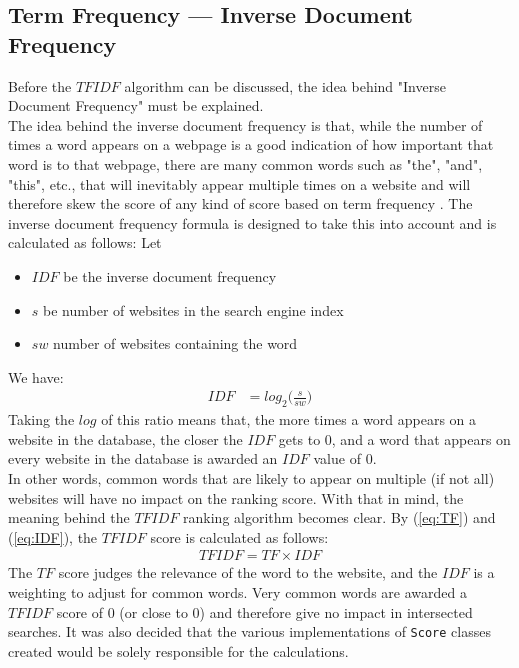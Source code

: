 \subsection{Term Frequency — Inverse Document Frequency}
Before the $TFIDF$ algorithm can be discussed, the idea behind "Inverse Document Frequency" must be explained.\\
The idea behind the inverse document frequency is that, while the number of times a word appears on a webpage is a good indication of how important that word is to that webpage, there are many common words such as "the", "and", "this", etc., that will inevitably appear multiple times on a website and will therefore skew the score of any kind of score based on term frequency \citep{Jones72astatistical}.
The inverse document frequency formula is designed to take this into account and is calculated as follows:\newline
Let
\begin{itemize}
    \item $IDF$ be the inverse document frequency
    \item $s$ be number of websites in the search engine index
    \item $sw$ number of websites containing the word
\end{itemize}
We have:
\begin{align}
    IDF &= log_{2}\bigg(\frac{s}{sw}\bigg)
    \label{eq:IDF}
\end{align}
Taking the $log$ of this ratio means that, the more times a word appears on a website in the database, the closer the $IDF$ gets to $0$, and a word that appears on every website in the database is awarded an $IDF$ value of $0$.\\
In other words, common words that are likely to appear on multiple (if not all) websites will have no impact on the ranking score. With that in mind, the meaning behind the $TFIDF$ ranking algorithm becomes clear. By (\ref{eq:TF}) and (\ref{eq:IDF}), the $TFIDF$ score is calculated as follows:
\begin{align*}
    TFIDF = TF \times IDF
\end{align*}
The $TF$ score judges the relevance of the word to the website, and the $IDF$ is a weighting to adjust for common words. Very common words are awarded a $TFIDF$ score of 0 (or close to 0) and therefore give no impact in intersected searches.\newline
It was also decided that the various implementations of {\tt Score} classes created would be solely responsible for the calculations.

